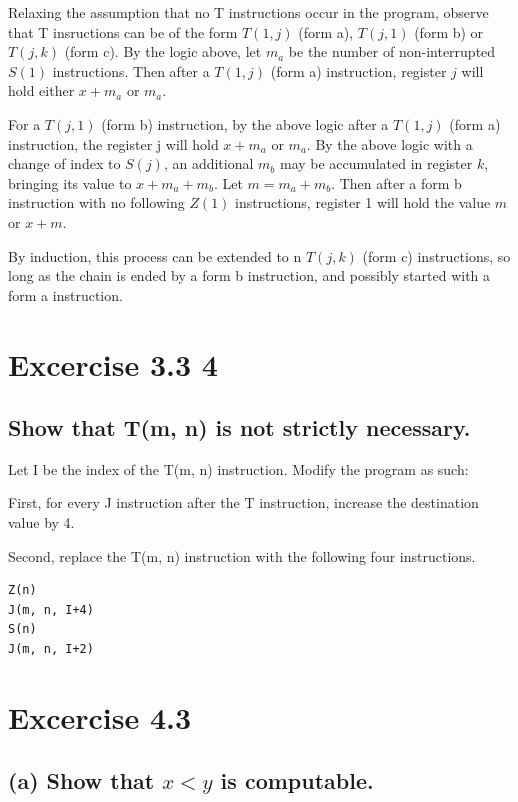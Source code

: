 \documentclass[fleqn]{article}
\begin{document}
Relaxing the assumption that no T instructions occur in the program, observe that T insructions can be of the form $T(1, j)$ (form a), $T(j, 1)$ (form b) or $T(j, k)$ (form c).
By the logic above, let $m_a$ be the number of non-interrupted $S(1)$ instructions.
Then after a $T(1, j)$ (form a) instruction, register $j$ will hold either $x+m_a$ or $m_a$.

For a $T(j, 1)$ (form b) instruction, by the above logic after a $T(1, j)$ (form a) instruction, the register j will hold $x+m_a$ or $m_a$.
By the above logic with a change of index to $S(j)$, an additional $m_b$ may be accumulated in register $k$, bringing its value to $x+m_a+m_b$.
Let $m = m_a + m_b$.
Then after a form b instruction with no following $Z(1)$ instructions, register 1 will hold the value $m$ or $x+m$.

By induction, this process can be extended to n $T(j, k)$ (form c) instructions, so long as the chain is ended by a form b instruction, and possibly started with a form a instruction.

\section*{Excercise 3.3 4}

\subsection*{Show that T(m, n) is not strictly necessary.}

Let I be the index of the T(m, n) instruction. Modify the program as such:

First, for every J instruction after the T instruction, increase the destination value by 4.

Second, replace the T(m, n) instruction with the following four instructions.

\begin{lstlisting}
Z(n)
J(m, n, I+4)
S(n)
J(m, n, I+2)
\end{lstlisting}

\section*{Excercise 4.3}

\subsection*{(a) Show that $x<y$ is computable.}
\end{document}
